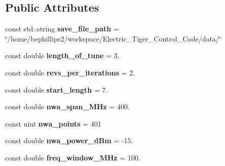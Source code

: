 \subsection*{Public Attributes}
\begin{DoxyCompactItemize}
\item 
\hypertarget{class_experiment_parameters_a1cfe3a5d3b3bffce5c0b890f35d7d7ba}{const std\+::string {\bfseries save\+\_\+file\+\_\+path} = \char`\"{}/home/bephillips2/workspace/Electric\+\_\+\+Tiger\+\_\+\+Control\+\_\+\+Code/data/\char`\"{}}\label{class_experiment_parameters_a1cfe3a5d3b3bffce5c0b890f35d7d7ba}

\item 
\hypertarget{class_experiment_parameters_ace5c189c9e18f1137e875a6487e8fd1a}{const double {\bfseries length\+\_\+of\+\_\+tune} = 3.}\label{class_experiment_parameters_ace5c189c9e18f1137e875a6487e8fd1a}

\item 
\hypertarget{class_experiment_parameters_ae6b8acdaee713344727231fe90cda43e}{const double {\bfseries revs\+\_\+per\+\_\+iterations} = 2.}\label{class_experiment_parameters_ae6b8acdaee713344727231fe90cda43e}

\item 
\hypertarget{class_experiment_parameters_ae1ad144064c4d84a0356262a66f6762e}{const double {\bfseries start\+\_\+length} = 7.}\label{class_experiment_parameters_ae1ad144064c4d84a0356262a66f6762e}

\item 
\hypertarget{class_experiment_parameters_ae6c893bbe23d5fa066b22a1eff53a7c0}{const double {\bfseries nwa\+\_\+span\+\_\+\+M\+Hz} = 400.}\label{class_experiment_parameters_ae6c893bbe23d5fa066b22a1eff53a7c0}

\item 
\hypertarget{class_experiment_parameters_a32013416c5253fb5e9a6dc1b6c18b0a1}{const uint {\bfseries nwa\+\_\+points} = 401}\label{class_experiment_parameters_a32013416c5253fb5e9a6dc1b6c18b0a1}

\item 
\hypertarget{class_experiment_parameters_ab16b546dab57c7077152a97053a041d0}{const double {\bfseries nwa\+\_\+power\+\_\+d\+Bm} = -\/15.}\label{class_experiment_parameters_ab16b546dab57c7077152a97053a041d0}

\item 
\hypertarget{class_experiment_parameters_a1d495d1cadd1cb8f3221d1adc7a2e92e}{const double {\bfseries freq\+\_\+window\+\_\+\+M\+Hz} = 100.}\label{class_experiment_parameters_a1d495d1cadd1cb8f3221d1adc7a2e92e}


\end{DoxyCompactItemize}
